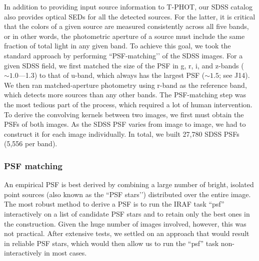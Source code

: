 \documentclass[apj,iop]{emulateapj}
\begin{document}
In addition to providing input source information to T-PHOT, our SDSS catalog also provides optical SEDs for all the detected sources. For the latter, it is critical that the colors of a given source are measured consistently across all five bands, or in other words, the photometric aperture of a source must include the same fraction of total light in any given band. To achieve this goal, we took the standard approach by performing ``PSF-matching’’ of the SDSS images. For a given SDSS field, we first matched the size of the PSF in g, r, i, and z-bands ($\sim 1.0$—1.3\arcsec) to that of u-band, which always has the largest PSF ($\sim 1.5$\arcsec; see J14). We then ran matched-aperture photometry using r-band as the reference band, which detects more sources than any other bands.
The PSF-matching step was the most tedious part of the process, which required a lot of human intervention. To derive the convolving kernels between two images, we first must obtain the PSFs of both images. As the SDSS PSF varies from image to image, we had to construct it for each image individually. In total, we built 27,780 SDSS PSFs (5,556 per band).
\subsubsection{PSF matching}

An empirical PSF is best derived by combining a large number of bright, isolated point sources (also known as the ``PSF stars’’) distributed over the entire image. The most robust method to derive a PSF is to run the IRAF task “psf” interactively on a list of candidate PSF stars and to retain only the best ones in the construction. Given the huge number of images involved, however, this was not practical. After  extensive tests, we settled on an approach that would result in reliable PSF stars, which would then allow us to run the “psf” task non-interactively in most cases.
\end{document}
